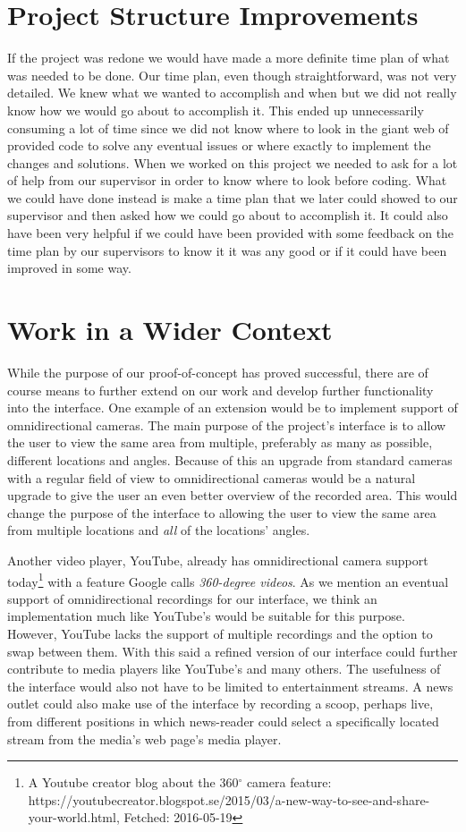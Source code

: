 \section{Project Structure Improvements}
\label{sec:psi}

If the project was redone we would have made a more definite time plan of what was needed to be done. Our time plan, even though straightforward, was not very detailed. We knew what we wanted to accomplish and when but we did not really know how we would go about to accomplish it. This ended up unnecessarily consuming a lot of time since we did not know where to look in the giant web of provided code to solve any eventual issues or where exactly to implement the changes and solutions. When we worked on this project we needed to ask for a lot of help from our supervisor in order to know where to look before coding. What we could have done instead is make a time plan that we later could showed to our supervisor and then asked how we could go about to accomplish it. It could also have been very helpful if we could have been provided with some feedback on the time plan by our supervisors to know it it was any good or if it could have been improved in some way. 

\section{Work in a Wider Context}
\label{sec:workinawidercontext}
While the purpose of our proof-of-concept has proved successful, there are of course means to further extend on our work and develop further functionality into the interface. One example of an extension would be to implement support of omnidirectional cameras. The main purpose of the project's interface is to allow the user to view the same area from multiple, preferably as many as possible, different locations and angles. Because of this an upgrade from standard cameras with a regular field of view to omnidirectional cameras would be a natural upgrade to give the user an even better overview of the recorded area. This would change the purpose of the interface to allowing the user to view the same area from multiple locations and \textit{all} of the locations' angles.

Another video player, YouTube, already has omnidirectional camera support today\footnote{A Youtube creator blog about the 360$^{\circ}$ camera feature: https://youtubecreator.blogspot.se/2015/03/a-new-way-to-see-and-share-your-world.html, Fetched: 2016-05-19} with a feature Google calls \textit{360-degree videos}. As we mention an eventual support of omnidirectional recordings for our interface, we think an implementation much like YouTube's would be suitable for this purpose. However, YouTube lacks the support of multiple recordings and the option to swap between them. With this said a refined version of our interface could further contribute to media players like YouTube's and many others. The usefulness of the interface would also not have to be limited to entertainment streams. A news outlet could also make use of the interface by recording a scoop, perhaps live, from different positions in which news-reader could select a specifically located stream from the media's web page's media player.

